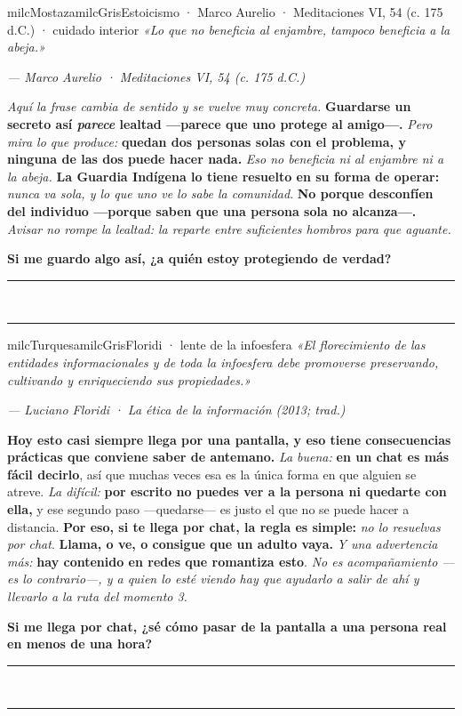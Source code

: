\documentclass[11pt,letterpaper]{article}
\newcommand{\linead}[1]{\noindent\color{milcLinea}\rule{#1}{0.5pt}\color{milcNegro}}
\begin{document}
\begin{softbox}{milcMostaza}{milcGris}{Estoicismo · Marco Aurelio · Meditaciones VI, 54 (c. 175 d.C.) · cuidado interior}
\textit{«Lo que no beneficia al enjambre, tampoco beneficia a la abeja.»}

{\footnotesize\itshape\color{milcNegro!70}--- Marco Aurelio · Meditaciones VI, 54 (c. 175 d.C.)}

\emph{Aquí la frase cambia de sentido y se vuelve muy concreta.} \textbf{Guardarse un secreto así \emph{parece} lealtad ---parece que uno protege al amigo---.} \emph{Pero mira lo que produce:} \textbf{quedan dos personas solas con el problema, y ninguna de las dos puede hacer nada.} \emph{Eso no beneficia ni al enjambre ni a la abeja.} \textbf{La Guardia Indígena lo tiene resuelto en su forma de operar:} \emph{nunca va sola, y lo que uno ve lo sabe la comunidad}. \textbf{No porque desconfíen del individuo ---porque saben que una persona sola no alcanza---.} \emph{Avisar no rompe la lealtad: la reparte entre suficientes hombros para que aguante.}

\textbf{Si me guardo algo así, ¿a quién estoy protegiendo de verdad?}
\end{softbox}
\linead{\linewidth}\\[1mm]
\linead{\linewidth}

\begin{softbox}{milcTurquesa}{milcGris}{Floridi · lente de la infoesfera}
\textit{«El florecimiento de las entidades informacionales y de toda la infoesfera debe promoverse preservando, cultivando y enriqueciendo sus propiedades.»}

{\footnotesize\itshape\color{milcNegro!70}--- Luciano Floridi · La ética de la información (2013; trad.)}

\textbf{Hoy esto casi siempre llega por una pantalla, y eso tiene consecuencias prácticas que conviene saber de antemano.} \emph{La buena:} \textbf{en un chat es más fácil decirlo}, así que muchas veces esa es la única forma en que alguien se atreve. \emph{La difícil:} \textbf{por escrito no puedes ver a la persona ni quedarte con ella,} y ese segundo paso ---quedarse--- es justo el que no se puede hacer a distancia. \textbf{Por eso, si te llega por chat, la regla es simple:} \emph{no lo resuelvas por chat}. \textbf{Llama, o ve, o consigue que un adulto vaya.} \emph{Y una advertencia más:} \textbf{hay contenido en redes que romantiza esto}. \emph{No es acompañamiento ---es lo contrario---, y a quien lo esté viendo hay que ayudarlo a salir de ahí y llevarlo a la ruta del momento 3.}

\textbf{Si me llega por chat, ¿sé cómo pasar de la pantalla a una persona real en menos de una hora?}
\end{softbox}
\linead{\linewidth}\\[1mm]
\linead{\linewidth}
\end{document}
